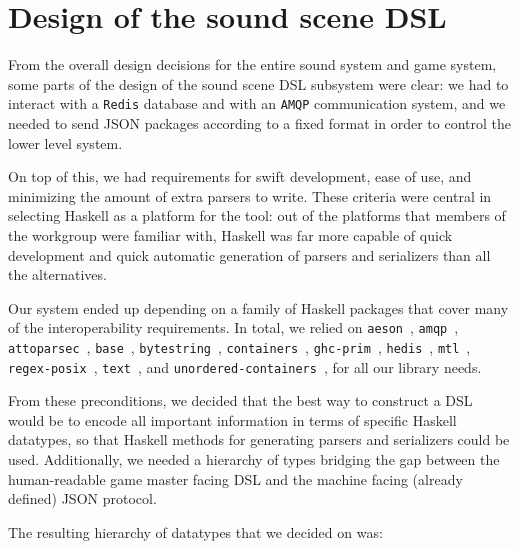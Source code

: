 \section{Design of the sound scene DSL}
\label{sec:design-sound-spec}


From the overall design decisions for the entire sound system and game
system, some parts of the design of the sound scene DSL subsystem were
clear: we had to interact with a \texttt{Redis} database and with
an \texttt{AMQP} communication system, and we needed to send JSON packages according to a
fixed format in order to control the lower level system.

On top of this, we had requirements for swift development, ease of
use, and minimizing the amount of extra parsers to write. These
criteria were central in selecting Haskell as a platform for the tool:
out of the platforms that members of the workgroup were familiar with,
Haskell was far more capable of quick development and quick automatic
generation of parsers and serializers than all the alternatives. 

Our system ended up depending on a family of Haskell packages that
cover many of the interoperability requirements. In total, we relied
on 
\texttt{aeson}~\cite{aeson}, 
\texttt{amqp}~\cite{amqp}, 
\texttt{attoparsec}~\cite{attoparsec}, 
\texttt{base}~\cite{haskell}, 
\texttt{bytestring}~\cite{bytestring},
\texttt{containers}~\cite{containers}, 
\texttt{ghc-prim}~\cite{haskell}, 
\texttt{hedis}~\cite{hedis},
\texttt{mtl}~\cite{mtl}, 
\texttt{regex-posix}~\cite{regex-posix}, 
\texttt{text}~\cite{text}, and
\texttt{unordered-containers}~\cite{unordered-containers}, 
for all our library needs.

From these preconditions, we decided that the best way to construct a
DSL would be to encode all important information in
terms of specific Haskell datatypes, so that Haskell methods for
generating parsers and serializers could be used. Additionally,
we needed a hierarchy of types bridging the gap
between the human-readable game master facing DSL and the machine facing
(already defined) JSON protocol.

The resulting hierarchy of datatypes that we decided on was:\nopagebreak

